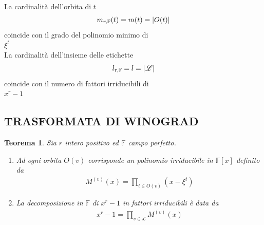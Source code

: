 \documentclass[mathserif]{beamer}
\newtheorem{teorema}{Teorema}
\begin{document}
\begin{frame}
   \begin{center}
      La cardinalità dell'orbita di $t$
        \begin{align*}
	  m_{r,\mathbb{F}}(t) = m(t) = \arrowvert O(t) \arrowvert
	\end{align*}
      coincide con il grado del polinomio minimo di \\
     $\xi^{t}$
     \vspace{0.5cm}
     \\
      La cardinalità dell'insieme delle etichette
 	\begin{align*}
	   l_{r,\mathbb{F}} = l = \arrowvert \mathscr{L} \arrowvert
	\end{align*}
     coincide con il numero di fattori irriducibili di \\ 
     $x^r-1$	
    \end{center}
\end{frame}

\subsection{TRASFORMATA DI WINOGRAD}
\begin{frame}
    \begin{teorema}
      Sia $r$ intero positivo ed $\mathbb{F}$ campo perfetto. 
      \begin{enumerate}
	  \item Ad ogni orbita $O(v)$ corrisponde un polinomio irriducibile in $\mathbb{F}[x]$ definito da 
		\begin{align*}
		  M^{(v)}(x) =  \prod_{t \in O(v)} (x- \xi^t)
		\end{align*}
	  \item La decomposizione in $\mathbb{F}$ di $x^r - 1$ in fattori irriducibili è data da 
		\begin{align*}
		  x^r - 1 = \prod_{v \in \mathscr{L} } M^{(v)}(x)
		\end{align*}
      \end{enumerate}
    \end{teorema}
\end{frame}
\end{document}
